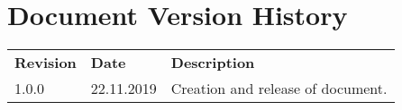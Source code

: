 \chapter{Document Version History}
\label{ch:versionhistory}
\begin{table}[h]
\begin{tabular}{lll}
\textbf{Revision} & \textbf{Date} & \textbf{Description}              \\
1.0.0             & 22.11.2019    & Creation and release of document.
\end{tabular}
\end{table}